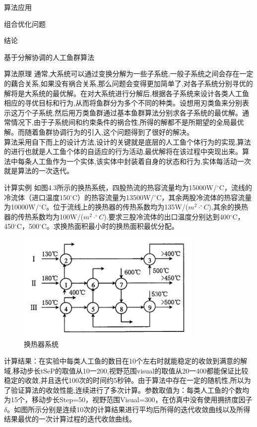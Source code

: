 \documentclass[UTF8]{ctexart}
\begin{document}
\begin{section}{算法应用}
\begin{subsection}{组合优化问题}
\begin{subsubsection}{结论}
\end{subsubsection}
\end{subsection}
\begin{subsection}{基于分解协调的人工鱼群算法}
\begin{subsubsection}{算法原理}
通常,大系统可以通过变换分解为一些子系统,一般子系统之间会存在一定的藕合关系,如果没有祸合关系,那么问题会变得更加简单了,对各子系统分别寻优的解将是大系统的最优解。在对大系统进行分解后,根据各子系统来设计各类人工鱼相应的寻优目标和行为,从而将鱼群分为多个不同的种类。设想用刃类鱼来分别表示这万个子系统,然后用万类鱼群通过基本鱼群算法分别求各子系统的最优解。通常情况下,由于子系统间和约束条件的祸合性,所得的解都不是所期望的全局最优解。而随着鱼群协调行为的引入,这个问题得到了很好的解决。\\
算法采用自下而上的设计方法,设计的关键就是底层的人工鱼个体行为的实现,算法的进行也就是人工鱼个体的自适应的行为活动,最优解将在该过程中突现出来。算法中每条人工鱼作为一个实体,该实体中封装着自身的状态和行为,实体每活动一次就是算法的一次迭代。
\end{subsubsection}
\begin{subsubsection}{计算实例}
如图4.3所示的换热系统，四股热流的热容流量均为15000W/$^{\circ}$C，流线\uppercase\expandafter{}的冷流体（进口温度150$^{\circ}$C）的热容流量为13500W/$^{\circ}$C，其余两股冷流体的热容流量为10000W/$^{\circ}$C。位于流线\uppercase\expandafter{}上的换热器的传热系数均为135W/($m^2\cdot ^{\circ}C $),其余的换热器的传热系数均为100W/($m^2\cdot ^{\circ}C $).要求三股冷流体的出口温度分别达到400$^{\circ}$C，450$^{\circ}$C，500$^{\circ}$C。求换热面积最小时的换热面积最优分配。
\begin{figure}[H]
\centering
\includegraphics[width=0.8\textwidth]{../../pic/fish15.png}
\caption{换热器系统}
\end{figure}
计算结果：在实验中每类人工鱼的数目在10个左右时就能稳定的收敛到满意的解域,移动步长tSeP的取值从10一200,视野范围visual的取值从20一400都能保证比较稳定的收敛,并且迭代100次的时间约5秒钟。由于算法中存在一定的随机性,所以为了验证算法的收敛性能,连续进行了多次计算。参数取值为：每类人工鱼的个数均为15个，移动步长Step=50，视野范围Visual=300，在仿真中没有使用拥挤度因子$\delta$。如图所示分别是连续10次的计算结果进行平均后所得的迭代收敛曲线以及所得结果最优的一次计算过程的迭代收敛曲线。


\end{subsubsection}
\end{subsection}
\end{section}
\end{document}
